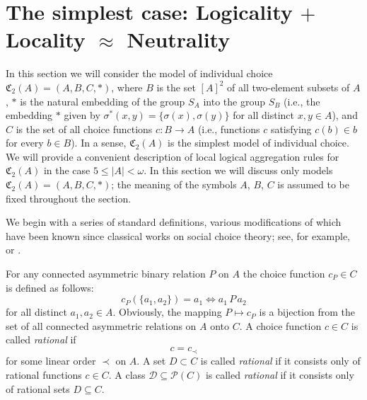 \documentclass[graybox]{SNmult}
\theoremstyle{definition}
\begin{document}
\section{The simplest case: Logicality $+$ Locality $\approx$ Neutrality}
\par In this section we will consider the model of individual choice $\mathfrak C_2(A)=(A, B, C, \ast)$, where $B$ is the set $[A]^2$ of all two-element subsets of $A$, $\ast$ is the natural embedding of the group $S_A$ into the group $S_B$ (i.e., the embedding $\ast$ given by $\sigma^\ast({x, y})=\{\sigma(x), \sigma(y)\}$ for all distinct $x, y\in A$), and $C$ is the set of all choice functions $c:B\to A$ (i.e., functions $c$ satisfying $c(b)\in b$ for every $b\in B$). In a sense, $\mathfrak C_2(A)$ is the simplest model of individual choice. We will provide a convenient description of local logical aggregation rules for $\mathfrak C_2(A)$ in the case $5\leq |A|<\omega$. In this section we will discuss only models $\mathfrak C_2(A)=(A, B, C, \ast)$; the meaning of the symbols $A$, $B$, $C$ is assumed to be fixed throughout the section.
\par We begin with a series of standard definitions, various modifications of which have been known since classical works on social choice theory; see, for example, \cite{Arrow, Arrow1} or \cite{Aleskerov1,Aleskerov2,Aleskerov3}.
\par For any connected asymmetric binary relation $P$ on $A$ the choice function $c_P\in C$ is defined as follows:
$$
c_P(\{a_1, a_2\})=a_1\Leftrightarrow a_1\, P\, a_2
$$
for all distinct $a_1, a_2\in A$. Obviously, the mapping $P\mapsto c_P$ is a bijection from the set of all connected asymmetric relations on $A$ onto $C$. A choice function $c\in C$ is called \textit{rational} if 
$$
c=c_\prec
$$
for some linear order $\prec$ on $A$. A set $D\subset C$ is called \textit{rational} if it consists only of rational functions $c\in C$. A class $\mathscr D\subseteq \mathscr P(C)$ is called \textit{rational} if it consists only of rational sets $D\subseteq C$.
\end{document}
